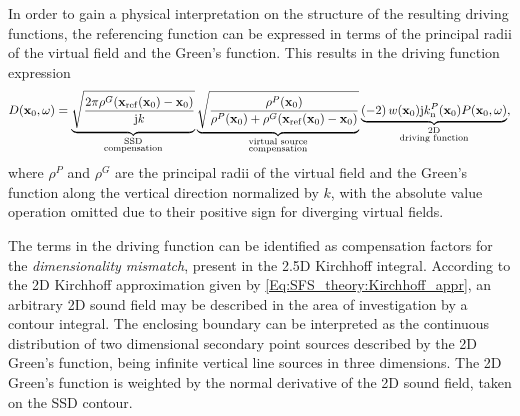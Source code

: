 In order to gain a physical interpretation on the structure of the resulting driving functions, the referencing function can be expressed in terms of the principal radii of the virtual field and the Green's function. 
This results in the driving function expression
\begin{equation}
\label{Eq:SFS_theory:25D_WFS_driv_fun_ver_2}
D(\mathbf{x}_0, \omega) = 
\underbrace{\sqrt{\frac{2\pi \rho^G(\mathbf{x}_{\mathrm{ref}}(\mathbf{x}_0)-\mathbf{x}_0) }{\mathrm{j} k}}}_{{\substack{\text{SSD}\\\text{compensation}}}}
\underbrace{\sqrt{ \frac{\rho^P(\mathbf{x}_0) }{\rho^P(\mathbf{x}_0) +  \rho^G(\mathbf{x}_{\mathrm{ref}}(\mathbf{x}_0)-\mathbf{x}_0) } }}_{{\substack{\text{virtual source}\\\text{compensation}}}}
\underbrace{\left(-2\right) w(\mathbf{x}_0)  \mathrm{j} k_{\mathrm{n}}^P(\mathbf{x}_0) 	P(\mathbf{x}_0,\omega)}_{\substack{\text{2D}\\\text{driving function}}},
\end{equation}
where $\rho^P$ and $\rho^G$ are the principal radii of the virtual field and the Green's function along the vertical direction normalized by $k$, with the absolute value operation omitted due to their positive sign for diverging virtual fields.

The terms in the driving function can be identified as compensation factors for the \emph{dimensionality mismatch}, present in the 2.5D Kirchhoff integral.
According to the 2D Kirchhoff approximation given by \eqref{Eq:SFS_theory:Kirchhoff_appr}, an arbitrary 2D sound field may be described in the area of investigation by a contour integral.
The enclosing boundary can be interpreted as the continuous distribution of two dimensional secondary point sources described by the 2D Green's function, being infinite vertical line sources in three dimensions.
The 2D Green's function is weighted by the normal derivative of the 2D sound field, taken on the SSD contour.

